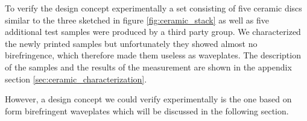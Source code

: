 To verify the design concept experimentally a set consisting of five ceramic discs similar to the three sketched in figure \ref{fig:ceramic_stack} as well as five additional test samples were produced by a third party group. We characterized the newly printed samples but unfortunately they showed almost no birefringence, which therefore made them useless as waveplates. The description of the samples and the results of the measurement are shown in the appendix section \ref{sec:ceramic_characterization}. 

However, a design concept we could verify experimentally is the one based on form birefringent waveplates which will be discussed in the following section.



